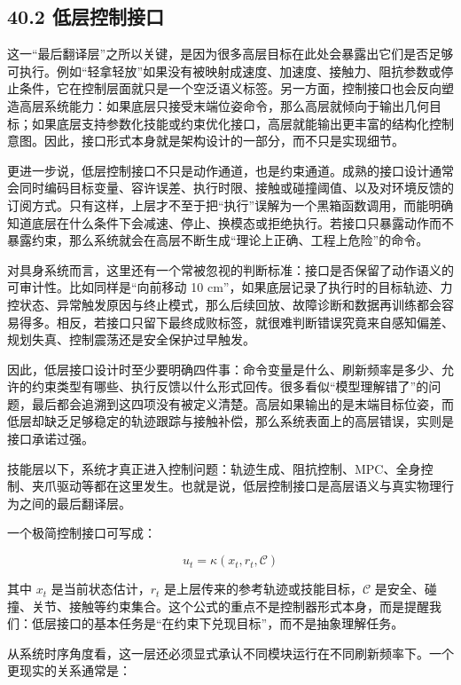 \subsection*{40.2 低层控制接口}


这一“最后翻译层”之所以关键，是因为很多高层目标在此处会暴露出它们是否足够可执行。例如“轻拿轻放”如果没有被映射成速度、加速度、接触力、阻抗参数或停止条件，它在控制层面就只是一个空泛语义标签。另一方面，控制接口也会反向塑造高层系统能力：如果底层只接受末端位姿命令，那么高层就倾向于输出几何目标；如果底层支持参数化技能或约束优化接口，高层就能输出更丰富的结构化控制意图。因此，接口形式本身就是架构设计的一部分，而不只是实现细节。

更进一步说，低层控制接口不只是动作通道，也是约束通道。成熟的接口设计通常会同时编码目标变量、容许误差、执行时限、接触或碰撞阈值、以及对环境反馈的订阅方式。只有这样，上层才不至于把“执行”误解为一个黑箱函数调用，而能明确知道底层在什么条件下会减速、停止、换模态或拒绝执行。若接口只暴露动作而不暴露约束，那么系统就会在高层不断生成“理论上正确、工程上危险”的命令。

对具身系统而言，这里还有一个常被忽视的判断标准：接口是否保留了动作语义的可审计性。比如同样是“向前移动 10 cm”，如果底层记录了执行时的目标轨迹、力控状态、异常触发原因与终止模式，那么后续回放、故障诊断和数据再训练都会容易得多。相反，若接口只留下最终成败标签，就很难判断错误究竟来自感知偏差、规划失真、控制震荡还是安全保护过早触发。

因此，低层接口设计时至少要明确四件事：命令变量是什么、刷新频率是多少、允许的约束类型有哪些、执行反馈以什么形式回传。很多看似“模型理解错了”的问题，最后都会追溯到这四项没有被定义清楚。高层如果输出的是末端目标位姿，而低层却缺乏足够稳定的轨迹跟踪与接触补偿，那么系统表面上的高层错误，实则是接口承诺过强。

技能层以下，系统才真正进入控制问题：轨迹生成、阻抗控制、MPC、全身控制、夹爪驱动等都在这里发生。也就是说，低层控制接口是高层语义与真实物理行为之间的最后翻译层。

一个极简控制接口可写成：

\begin{equation*}
u_t = \kappa(x_t, r_t, \mathcal{C})
\end{equation*}

其中 \(x_t\) 是当前状态估计，\(r_t\) 是上层传来的参考轨迹或技能目标，\(\mathcal{C}\) 是安全、碰撞、关节、接触等约束集合。这个公式的重点不是控制器形式本身，而是提醒我们：低层接口的基本任务是“在约束下兑现目标”，而不是抽象理解任务。

从系统时序角度看，这一层还必须显式承认不同模块运行在不同刷新频率下。一个更现实的关系通常是：


